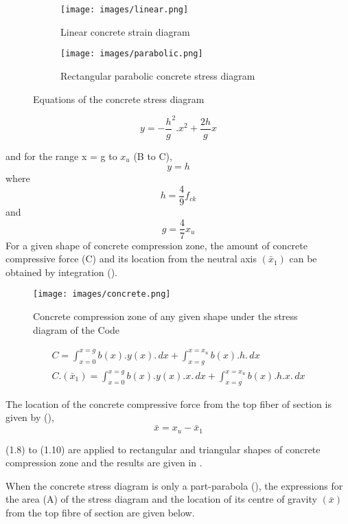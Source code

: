 \begin{figure}
\begin{subfigure}{0.5\textwidth}
\centering
\texttt{[image: images/linear.png]}
\caption{Linear concrete strain diagram}
\label{fig:linear}
\end{subfigure}
%
\begin{subfigure}{0.5\textwidth}
\centering
\texttt{[image: images/parabolic.png]}
\caption{Rectangular parabolic concrete stress diagram}
\label{fig:parabolic}
\end{subfigure}
\caption{Equations of the concrete stress diagram}
\label{fig:equations}
\end{figure}

\begin{equation}
y=-\frac{h}{g}^2.x^2+\frac{2h}{g} x
\end{equation}

and for the range x = g to $x_{u}$ (B to C),
\begin{equation}
y=h
\end{equation}
where
$$h=\frac{4}{9}f_{ck}$$
and
$$g=\frac{4}{7}x_u$$
For a given shape of concrete compression zone, the amount of concrete
compressive force (C) and its location from the neutral axis ${(\bar x_1)}$
can be obtained by integration ().

\begin{figure}
\centering
\texttt{[image: images/concrete.png]}
\caption{Concrete compression zone of any given shape under the stress diagram of the Code}
\label{fig:concrete}
\end{figure}

\begin{align}
C=\int_{x=0}^{x=g}b(x).y(x).\,dx+\int_{{x=g}}^{x=x_u}b(x).h.\,dx\\
C.(\bar x_1)=\int_{x=0}^{x=g}b(x).y(x).x.\,dx+\int_{{x=g}}^{x=x_u}b(x).h.x.\,dx
\end{align}

The location of the concrete compressive force from the top fiber of 
section is given by (),
\begin{equation}
\bar x=x_u-\bar x_1
\end{equation}

\eqn (1.8) to \eqn (1.10) are applied to rectangular and triangular
shapes of concrete compression zone and the results are given in .

When the concrete stress diagram is only a part-parabola (), 
the expressions for the area (A) of the stress diagram and the location
of its centre of gravity ${(\bar x)}$ from the top fibre of section are
given below.

